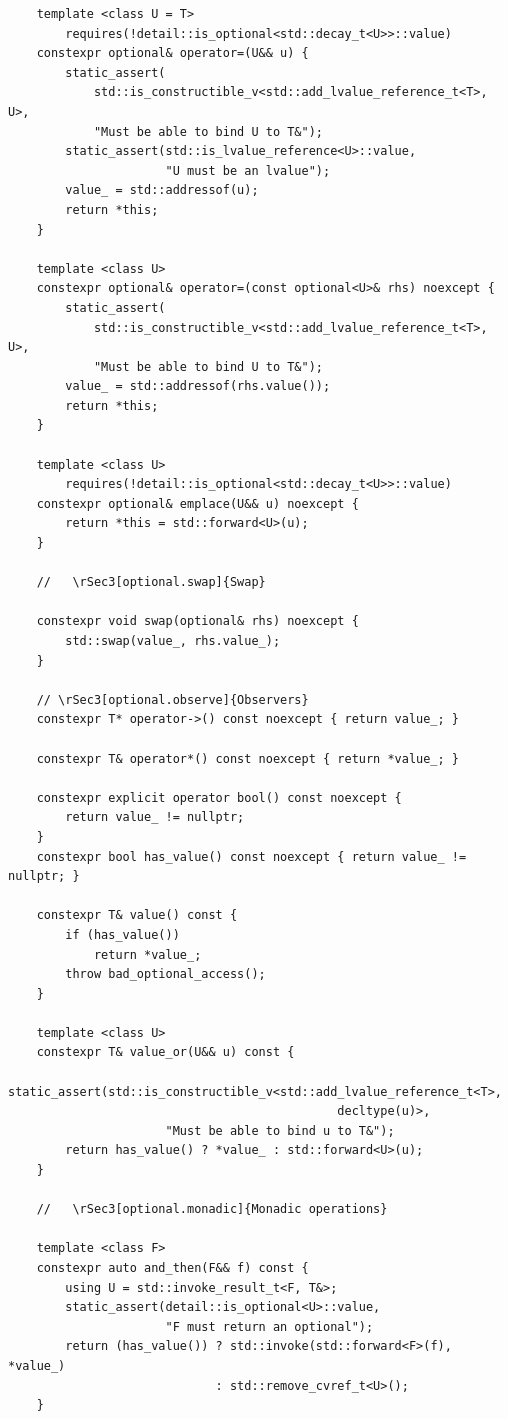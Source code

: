 \documentclass[a4paper,10pt,oneside,openany,final,article]{memoir}
\begin{document}
\begin{verbatim}
    template <class U = T>
        requires(!detail::is_optional<std::decay_t<U>>::value)
    constexpr optional& operator=(U&& u) {
        static_assert(
            std::is_constructible_v<std::add_lvalue_reference_t<T>, U>,
            "Must be able to bind U to T&");
        static_assert(std::is_lvalue_reference<U>::value,
                      "U must be an lvalue");
        value_ = std::addressof(u);
        return *this;
    }

    template <class U>
    constexpr optional& operator=(const optional<U>& rhs) noexcept {
        static_assert(
            std::is_constructible_v<std::add_lvalue_reference_t<T>, U>,
            "Must be able to bind U to T&");
        value_ = std::addressof(rhs.value());
        return *this;
    }

    template <class U>
        requires(!detail::is_optional<std::decay_t<U>>::value)
    constexpr optional& emplace(U&& u) noexcept {
        return *this = std::forward<U>(u);
    }

    //   \rSec3[optional.swap]{Swap}

    constexpr void swap(optional& rhs) noexcept {
        std::swap(value_, rhs.value_);
    }

    // \rSec3[optional.observe]{Observers}
    constexpr T* operator->() const noexcept { return value_; }

    constexpr T& operator*() const noexcept { return *value_; }

    constexpr explicit operator bool() const noexcept {
        return value_ != nullptr;
    }
    constexpr bool has_value() const noexcept { return value_ != nullptr; }

    constexpr T& value() const {
        if (has_value())
            return *value_;
        throw bad_optional_access();
    }

    template <class U>
    constexpr T& value_or(U&& u) const {
        static_assert(std::is_constructible_v<std::add_lvalue_reference_t<T>,
                                              decltype(u)>,
                      "Must be able to bind u to T&");
        return has_value() ? *value_ : std::forward<U>(u);
    }

    //   \rSec3[optional.monadic]{Monadic operations}

    template <class F>
    constexpr auto and_then(F&& f) const {
        using U = std::invoke_result_t<F, T&>;
        static_assert(detail::is_optional<U>::value,
                      "F must return an optional");
        return (has_value()) ? std::invoke(std::forward<F>(f), *value_)
                             : std::remove_cvref_t<U>();
    }


\end{verbatim}
\end{document}
